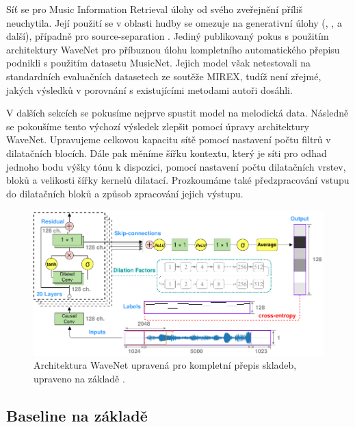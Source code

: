 Síť se pro Music Information Retrieval úlohy od svého zveřejnění příliš neuchytila. Její použití se v oblasti hudby se omezuje na generativní úlohy (\cite{Hawthorne2018a}, \cite{Yang2017}, \cite{Engel2017} a další), případně pro source-separation \citep{Stoller2018}. Jediný publikovaný pokus s použitím architektury WaveNet pro příbuznou úlohu kompletního automatického přepisu podnikli \cite{Martak2018} s použitím datasetu MusicNet. Jejich model však netestovali na standardních evaluačních datasetech ze soutěže MIREX, tudíž není zřejmé, jakých výsledků v porovnání s existujícími metodami autoři dosáhli.

V dalších sekcích se pokusíme nejprve spustit model \cite{Martak2018} na melodická data. Následně se pokoušíme tento výchozí výsledek zlepšit pomocí úpravy architektury WaveNet. Upravujeme celkovou kapacitu sítě pomocí nastavení počtu filtrů v dilatačních blocích. Dále pak měníme šířku kontextu, který je síti pro odhad jednoho bodu výšky tónu k dispozici, pomocí nastavení počtu dilatačních vrstev, bloků a velikosti šířky kernelů dilatací. Prozkoumáme také předzpracování vstupu do dilatačních bloků a způsob zpracování jejich výstupu.

\begin{figure}[h]\centering
\includegraphics[width=\textwidth,height=\textheight,keepaspectratio]{../img/wavenet_arch}
\caption{Architektura WaveNet upravená pro kompletní přepis skladeb, upraveno na základě \cite{Martak2018}.}
\label{obr:wavenet_arch}
\end{figure}

\subsection{Baseline na základě \cite{Martak2018}}

